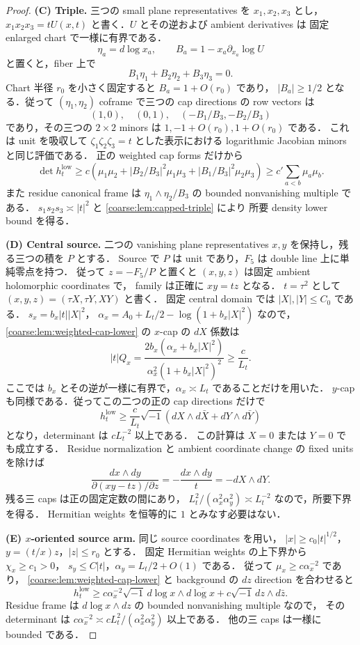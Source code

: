 \documentclass[a4paper,11pt]{ltjsarticle}
\numberwithin{equation}{section}
\theoremstyle{plain}
\theoremstyle{definition}
\theoremstyle{remark}
\begin{document}
\begin{proof}
\medskip\noindent
\textbf{(C) Triple.}
三つの small plane representatives を $x_1,x_2,x_3$ とし，
$x_1x_2x_3=tU(x,t)$ と書く．$U$ とその逆および ambient derivatives は
固定 enlarged chart で一様に有界である．
\[
 \eta_a=d\log x_a,\qquad
 B_a=1-x_a\partial_{x_a}\log U
\]
と置くと，fiber 上で
\[
 B_1\eta_1+B_2\eta_2+B_3\eta_3=0.
\]
Chart 半径 $r_0$ を小さく固定すると $B_a=1+O(r_0)$ であり，
$|B_a|\ge1/2$ となる．従って $(\eta_1,\eta_2)$ coframe で三つの cap directions の
row vectors は
\[
 (1,0),\quad(0,1),\quad(-B_1/B_3,-B_2/B_3)
\]
であり，その三つの $2\times2$ minors は $1,-1+O(r_0),1+O(r_0)$ である．
これは unit を吸収して $\zeta_1\zeta_2\zeta_3=t$ とした表示における
logarithmic Jacobian minors と同じ評価である．
正の weighted cap forms だけから
\[
 \det h_t^{\mathrm{low}}
 \ge c\left(
   \mu_1\mu_2+|B_2/B_3|^2\mu_1\mu_3
              +|B_1/B_3|^2\mu_2\mu_3\right)
 \ge c'\sum_{a<b}\mu_a\mu_b.
\]
また residue canonical frame は
$\eta_1\wedge\eta_2/B_3$ の bounded nonvanishing multiple である．
$s_1s_2s_3\asymp|t|^2$ と \cref{coarse:lem:capped-triple} により
所要 density lower bound を得る．

\medskip\noindent
\textbf{(D) Central source.}
二つの vanishing plane representatives $x,y$ を保持し，残る三つの積を $P$ とする．
Source で $P$ は unit であり，$F_5$ は double line 上に単純零点を持つ．
従って $z=-F_5/P$ と置くと $(x,y,z)$ は固定 ambient holomorphic coordinates で，
family は正確に $xy=tz$ となる．
$t=\tau^2$ として $(x,y,z)=(\tau X,\tau Y,XY)$ と書く．
固定 central domain では $|X|,|Y|\le C_0$ である．
$s_x=b_x|t||X|^2$，
$\alpha_x=A_0+L_t/2-\log(1+b_x|X|^2)$ なので，
\cref{coarse:lem:weighted-cap-lower} の
$x$-cap の $dX$ 係数は
\[
 |t|Q_x
  =\frac{2b_x(\alpha_x+b_x|X|^2)}
         {\alpha_x^2(1+b_x|X|^2)^2}
  \ge \frac c{L_t}.
\]
ここでは $b_x$ とその逆が一様に有界で，$\alpha_x\asymp L_t$ であることだけを用いた．
$y$-cap も同様である．従ってこの二つの正の cap directions だけで
\[
 h_t^{\mathrm{low}}
 \ge\frac c{L_t}
       \sqrt{-1}(dX\wedge d\bar X+dY\wedge d\bar Y)
\]
となり，determinant は $cL_t^{-2}$ 以上である．
この計算は $X=0$ または $Y=0$ でも成立する．
Residue normalization と ambient coordinate change の fixed units を除けば
\[
 \frac{dx\wedge dy}{\partial(xy-tz)/\partial z}
 =-\frac{dx\wedge dy}{t}=-dX\wedge dY.
\]
残る三 caps は正の固定定数の間にあり，
$L_t^2/(\alpha_x^2\alpha_y^2)\asymp L_t^{-2}$ なので，所要下界を得る．
Hermitian weights を恒等的に $1$ とみなす必要はない．

\medskip\noindent
\textbf{(E) $x$-oriented source arm.}
同じ source coordinates を用い，
$|x|\ge c_0|t|^{1/2}$，$y=(t/x)z$，$|z|\le r_0$ とする．
固定 Hermitian weights の上下界から $\chi_x\ge c_1>0$，
$s_y\le C|t|$，$\alpha_y=L_t/2+O(1)$ である．
従って $\mu_x\ge c\alpha_x^{-2}$ であり，
\cref{coarse:lem:weighted-cap-lower} と background の $dz$ direction を合わせると
\[
 h_t^{\mathrm{low}}
 \ge c\alpha_x^{-2}\sqrt{-1}\,d\log x\wedge d\overline{\log x}
       +c\sqrt{-1}\,dz\wedge d\bar z.
\]
Residue frame は $d\log x\wedge dz$ の bounded nonvanishing multiple なので，
その determinant は
$c\alpha_x^{-2}\asymp cL_t^2/(\alpha_x^2\alpha_y^2)$ 以上である．
他の三 caps は一様に bounded である．


\end{proof}
\end{document}

